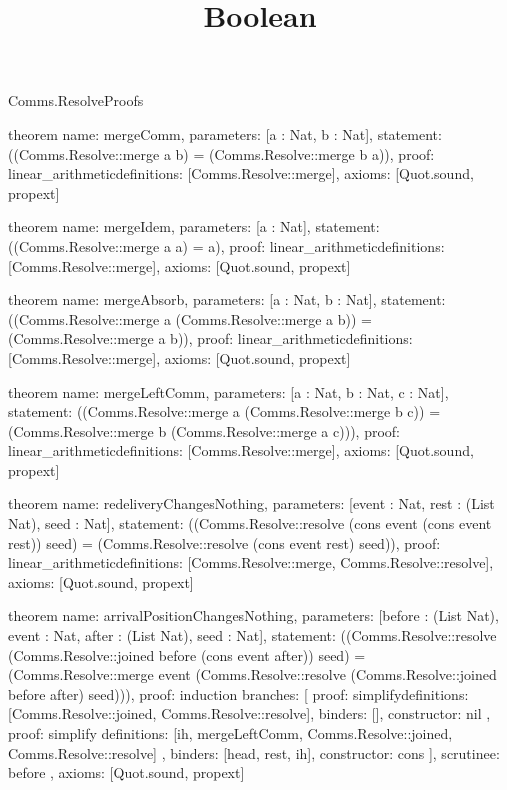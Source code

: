 \begin{lexlean}{Comms.ResolveProofs}
\title{Boolean}
\begin{semanticmodule}
theorem{
  name: mergeComm,
  parameters: [a : Nat, b : Nat],
  statement: ((Comms.Resolve::merge a b) = (Comms.Resolve::merge b a)),
  proof: linear_arithmetic{definitions: [Comms.Resolve::merge]},
  axioms: [Quot.sound, propext]
}

theorem{
  name: mergeIdem,
  parameters: [a : Nat],
  statement: ((Comms.Resolve::merge a a) = a),
  proof: linear_arithmetic{definitions: [Comms.Resolve::merge]},
  axioms: [Quot.sound, propext]
}

theorem{
  name: mergeAbsorb,
  parameters: [a : Nat, b : Nat],
  statement: ((Comms.Resolve::merge a (Comms.Resolve::merge a b)) = (Comms.Resolve::merge a b)),
  proof: linear_arithmetic{definitions: [Comms.Resolve::merge]},
  axioms: [Quot.sound, propext]
}

theorem{
  name: mergeLeftComm,
  parameters: [a : Nat, b : Nat, c : Nat],
  statement: ((Comms.Resolve::merge a (Comms.Resolve::merge b c)) = (Comms.Resolve::merge b (Comms.Resolve::merge a c))),
  proof: linear_arithmetic{definitions: [Comms.Resolve::merge]},
  axioms: [Quot.sound, propext]
}

theorem{
  name: redeliveryChangesNothing,
  parameters: [event : Nat, rest : (List Nat), seed : Nat],
  statement: ((Comms.Resolve::resolve (cons event (cons event rest)) seed) = (Comms.Resolve::resolve (cons event rest) seed)),
  proof: linear_arithmetic{definitions: [Comms.Resolve::merge, Comms.Resolve::resolve]},
  axioms: [Quot.sound, propext]
}

theorem{
  name: arrivalPositionChangesNothing,
  parameters: [before : (List Nat), event : Nat, after : (List Nat), seed : Nat],
  statement: ((Comms.Resolve::resolve (Comms.Resolve::joined before (cons event after)) seed) = (Comms.Resolve::merge event (Comms.Resolve::resolve (Comms.Resolve::joined before after) seed))),
  proof: induction{
    branches: [
      {
        proof: simplify{definitions: [Comms.Resolve::joined, Comms.Resolve::resolve]},
        binders: [],
        constructor: nil
      },
      {
        proof: simplify{
          definitions: [ih, mergeLeftComm, Comms.Resolve::joined, Comms.Resolve::resolve]
        },
        binders: [head, rest, ih],
        constructor: cons
      }
    ],
    scrutinee: before
  },
  axioms: [Quot.sound, propext]
}


\end{semanticmodule}
\end{lexlean}
